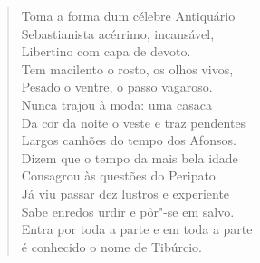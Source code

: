 \begin{verse}
Toma a forma dum célebre Antiquário\\
Sebastianista acérrimo, incansável,\\
Libertino com capa de devoto.\\
Tem macilento o rosto, os olhos vivos,\\
Pesado o ventre, o passo vagaroso.\\
Nunca trajou à moda: uma casaca\\
Da cor da noite o veste e traz pendentes\\
Largos canhões do tempo dos Afonsos.\\
Dizem que o tempo da mais bela idade\\
Consagrou às questões do Peripato.\\ 	\index{\Perip}
Já viu passar dez lustros e experiente\\
Sabe enredos urdir e pôr"-se em salvo.\\
Entra por toda a parte e em toda a parte\\
é conhecido o nome de Tibúrcio. \\[10pt]



\end{verse}
